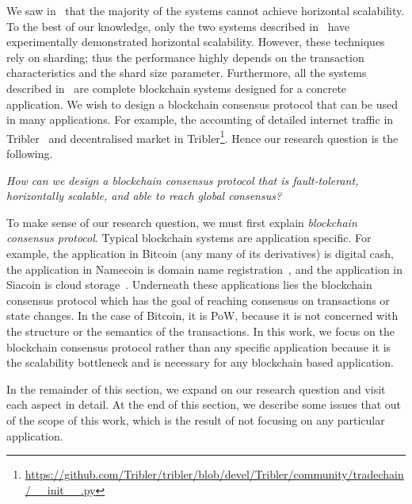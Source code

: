 We saw in~ that the majority of the systems cannot achieve horizontal scalability.
To the best of our knowledge, only the two systems described in~ have experimentally demonstrated horizontal scalability.
However, these techniques rely on sharding; thus the performance highly depends on the transaction characteristics and the shard size parameter.
Furthermore, all the systems described in~ are complete blockchain systems designed for a concrete application.
We wish to design a blockchain consensus protocol that can be used in many applications.
For example, the accounting of detailed internet traffic in Tribler~\cite{pouwelse2008tribler, multichain} and decentralised market in Tribler\footnote{\url{https://github.com/Tribler/tribler/blob/devel/Tribler/community/tradechain/__init__.py}}.
Hence our research question is the following.
\begin{displayquote}
\emph{How can we design a blockchain consensus protocol that is fault-tolerant,
horizontally scalable,
and able to reach global consensus?}
\end{displayquote}

To make sense of our research question, we must first explain \emph{blockchain consensus protocol}.
Typical blockchain systems are application specific.
For example, the application in Bitcoin (any many of its derivatives) is digital cash,
the application in Namecoin is domain name registration~\cite{namecoin},
and the application in Siacoin is cloud storage~\cite{siacoin}.
Underneath these applications lies the blockchain consensus protocol which has the goal of reaching consensus on transactions or state changes.
In the case of Bitcoin, it is PoW,
because it is not concerned with the structure or the semantics of the transactions.
In this work, we focus on the blockchain consensus protocol rather than any specific application because it is the scalability bottleneck and is necessary for any blockchain based application.

In the remainder of this section, we expand on our research question and visit each aspect in detail.
At the end of this section, we describe some issues that out of the scope of this work,
which is the result of not focusing on any particular application.


